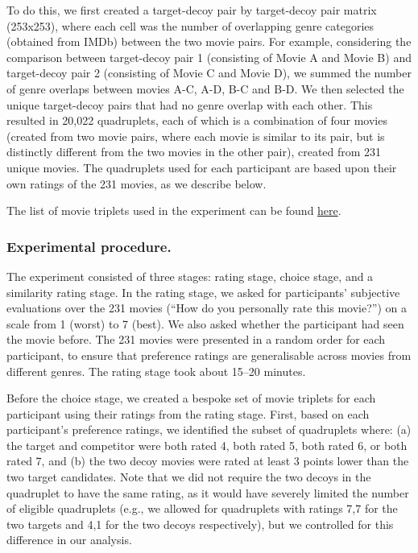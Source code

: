 \documentclass[12pt, a4paper]{article}
\begin{document}
To do this, we first created a target-decoy pair by target-decoy pair matrix (253x253), where each cell was the number of overlapping genre categories (obtained from IMDb) between the two movie pairs. For example, considering the comparison between target-decoy pair 1 (consisting of Movie A and Movie B) and target-decoy pair 2 (consisting of Movie C and Movie D), we summed the number of genre overlaps between movies A-C, A-D, B-C and B-D. We then selected the unique target-decoy pairs that had no genre overlap with each other. This resulted in 20,022 quadruplets, each of which is a combination of four movies (created from two movie pairs, where each movie is similar to its pair, but is distinctly different from the two movies in the other pair), created from 231 unique movies. The quadruplets used for each participant are based upon their own ratings of the 231 movies, as we describe below.


The list of movie triplets used in the experiment can be found \href{https://osf.io/fme6c/?view_only=31da4193689f4247a76af93b2f98fcef}{here}.

\subsubsection*{Experimental procedure.}

The experiment consisted of three stages: rating stage, choice stage, and a similarity rating stage. In the rating stage, we asked for participants' subjective evaluations over the 231 movies (``How do you personally rate this movie?'') on a scale from 1 (worst) to 7 (best). We also asked whether the participant had seen the movie before. The 231 movies were presented in a random order for each participant, to ensure that preference ratings are generalisable across movies from different genres. The rating stage took about 15--20 minutes.

Before the choice stage, we created a bespoke set of movie triplets for each participant using their ratings from the rating stage. First, based on each participant's preference ratings, we identified the subset of quadruplets where: (a) the target and competitor were both rated 4, both rated 5, both rated 6, or both rated 7, and (b) the two decoy movies were rated at least 3 points lower than the two target candidates. Note that we did not require the two decoys in the quadruplet to have the same rating, as it would have severely limited the number of eligible quadruplets (e.g., we allowed for quadruplets with ratings 7,7 for the two targets and 4,1 for the two decoys respectively), but we controlled for this difference in our analysis.
\end{document}
